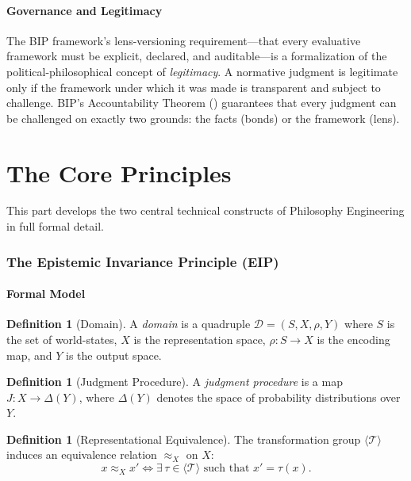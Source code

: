 \documentclass[12pt,letterpaper]{article}
\theoremstyle{definition}
\newtheorem{definition}[theorem]{Definition}
\theoremstyle{plain}
\newcommand{\calD}{\mathcal{D}}
\newcommand{\genT}{\langle \mathcal{T} \rangle}
\newcommand{\equivX}{\approx_X}
\begin{document}
\subsection{Governance and Legitimacy}

The BIP framework's lens-versioning requirement---that every evaluative framework must be explicit, declared, and auditable---is a formalization of the political-philosophical concept of \emph{legitimacy}. A normative judgment is legitimate only if the framework under which it was made is transparent and subject to challenge. BIP's Accountability Theorem () guarantees that every judgment can be challenged on exactly two grounds: the facts (bonds) or the framework (lens).


\part{The Core Principles}
\label{part:principles}

This part develops the two central technical constructs of Philosophy Engineering in full formal detail.

\section{The Epistemic Invariance Principle (EIP)}
\label{sec:eip}

\subsection{Formal Model}

\begin{definition}[Domain]
A \emph{domain} is a quadruple $\calD = (S, X, \rho, Y)$ where $S$ is the set of world-states, $X$ is the representation space, $\rho: S \to X$ is the encoding map, and $Y$ is the output space.
\end{definition}

\begin{definition}[Judgment Procedure]
A \emph{judgment procedure} is a map $J: X \to \Delta(Y)$, where $\Delta(Y)$ denotes the space of probability distributions over $Y$.
\end{definition}

\begin{definition}[Representational Equivalence]
The transformation group $\genT$ induces an equivalence relation $\equivX$ on $X$:
\[
x \equivX x' \iff \exists\, \tau \in \genT \text{ such that } x' = \tau(x).
\]
\end{definition}
\end{document}
